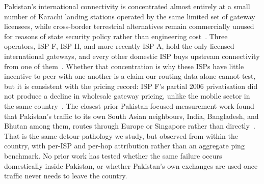\documentclass[sigconf,anonymous,10pt]{acmart}
\begin{document}
Pakistan's international connectivity is concentrated almost entirely at a small number of Karachi landing stations operated by the same limited set of gateway licensees, while cross-border terrestrial alternatives remain commercially unused for reasons of state security policy rather than engineering cost~\cite{opalinski2024quest}. Three operators, ISP F, ISP H, and more recently ISP A, hold the only licensed international gateways, and every other domestic ISP buys upstream connectivity from one of them~\cite{pacra2026telecom}. Whether that concentration is why these ISPs have little incentive to peer with one another is a claim our routing data alone cannot test, but it is consistent with the pricing record: ISP F's partial $2006$ privatisation did not produce a decline in wholesale gateway pricing, unlike the mobile sector in the same country~\cite{gonzalez2026peering}. The closest prior Pakistan-focused measurement work found that Pakistan's traffic to its own South Asian neighbours, India, Bangladesh, and Bhutan among them, routes through Europe or Singapore rather than directly~\cite{ali2017internet}. That is the same detour pathology we study, but observed from within the country, with per-ISP and per-hop attribution rather than an aggregate ping benchmark. No prior work has tested whether the same failure occurs domestically inside Pakistan, or whether Pakistan's own exchanges are used once traffic never needs to leave the country.

\end{document}
